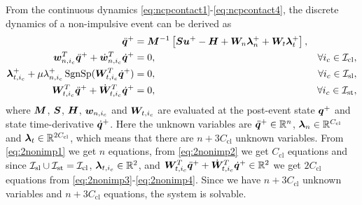 \documentclass[../DC2017114Bouma.tex]{subfiles}
\begin{document}
From the continuous dynamics \eqref{eq:ncpcontact1}-\eqref{eq:ncpcontact4}, the discrete dynamics of a non-impulsive event can be derived as
\begin{align}
\ddot{{\boldsymbol{q}}}^+ &= {\boldsymbol{M}}^{-1}\left[{\boldsymbol{S}}{\boldsymbol{u}}^+ - {\boldsymbol{H}} + {\boldsymbol{W}}_{n}\boldsymbol{\lambda}^+_{n} + {\boldsymbol{W}}_{t}\boldsymbol{\lambda}^+_{t}\right], &  \label{eq:2nonimp1}\\
{\boldsymbol{w}}^T_{n,i_c}\ddot{{\boldsymbol{q}}}^+ + \dot{{\boldsymbol{w}}}^T_{n,i_c}\dot{{\boldsymbol{q}}}^+ &= 0, & \forall i_c\in\mathcal{I}_{\text{cl}},\label{eq:2nonimp2}\\
\boldsymbol{\lambda}^+_{t,i_c} + \mu\lambda^+_{n,i_c}\operatorname{\text{SgnSp}}({\boldsymbol{W}}_{t,i_c}^T\dot{{\boldsymbol{q}}}^+) &= 0, & \forall i_c\in\mathcal{I}_{\text{sl}},\label{eq:2nonimp3}\\
{\boldsymbol{W}}^T_{t,i_c}\ddot{{\boldsymbol{q}}}^+ + \dot{{\boldsymbol{W}}}^T_{t,i_c}\dot{{\boldsymbol{q}}}^+ &= 0, & \forall i_c\in\mathcal{I}_{\text{st}},\label{eq:2nonimp4}
\end{align}
where ${\boldsymbol{M}}$, ${\boldsymbol{S}}$, ${\boldsymbol{H}}$, ${\boldsymbol{w}}_{n,i_c}$ and ${\boldsymbol{W}}_{t,i_c}$ are evaluated at the post-event state ${\boldsymbol{q}}^+$ and state time-derivative $\dot{{\boldsymbol{q}}}^+$. Here the unknown variables are $\ddot{{\boldsymbol{q}}}^+\in\mathbb{R}^{n}$, $\boldsymbol{\lambda}_{n}\in\mathbb{R}^{C_{\text{cl}}}$ and $\boldsymbol{\lambda}_{t}\in\mathbb{R}^{2C_{\text{cl}}}$, which means that there are $n+3C_{\text{cl}}$ unknown variables. From \eqref{eq:2nonimp1} we get $n$ equations, from \eqref{eq:2nonimp2} we get $C_{\text{cl}}$ equations and since $\mathcal{I}_{\text{sl}}\cup\mathcal{I}_{\text{st}}=\mathcal{I}_{\text{cl}}$, $\boldsymbol{\lambda}_{t,i_c}\in\mathbb{R}^2$, and ${\boldsymbol{W}}^T_{t,i_c}\ddot{{\boldsymbol{q}}}^+ + \dot{{\boldsymbol{W}}}^T_{t,i_c}\dot{{\boldsymbol{q}}}^+ \in\mathbb{R}^2$ we get $2C_{\text{cl}}$ equations from \eqref{eq:2nonimp3}-\eqref{eq:2nonimp4}. Since we have $n+3C_{\text{cl}}$ unknown variables and $n+3C_{\text{cl}}$ equations, the system is solvable.
\end{document}
